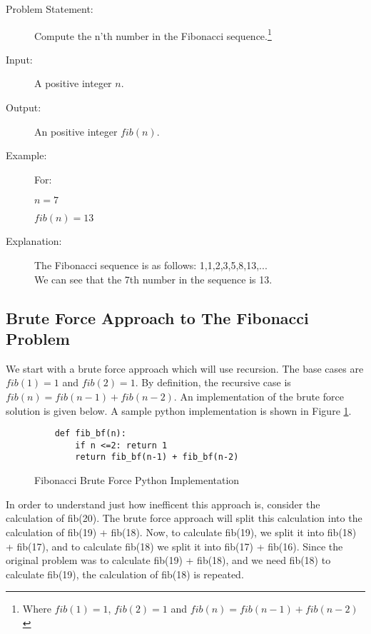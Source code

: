 \begin{description}
    \item[Problem Statement:]
        Compute the n'th number in the Fibonacci sequence.\footnote{Where $fib(1) = 1$, $fib(2) = 1$ and $fib(n) = fib(n-1) + fib(n-2)$}
        
    \item[Input:] 
        A positive integer $n$.
        
    \item[Output:] 
        An positive integer $fib(n)$.
        
    \item[Example:]
        For: 

        $n = 7$
        
        $fib(n) = 13$

    \item[Explanation:]
        The Fibonacci sequence is as follows: 1,1,2,3,5,8,13,...\\
        We can see that the 7th number in the sequence is 13.

\end{description}


\subsection{Brute Force Approach to The Fibonacci Problem}

We start with a brute force approach which will use recursion. 
The base cases are $fib(1) = 1$ and $fib(2) = 1$.
By definition, the recursive case is $fib(n) = fib(n-1) + fib(n-2)$.
An implementation of the brute force solution is given below.
A sample python implementation is shown in Figure \ref{fig:fibonacci-bf}.

\begin{figure}[H]
    \centering
    \begin{lstlisting}
    def fib_bf(n):
        if n <=2: return 1
        return fib_bf(n-1) + fib_bf(n-2)
    \end{lstlisting}
    \caption{Fibonacci Brute Force Python Implementation}
    \label{fig:fibonacci-bf}
\end{figure}

In order to understand just how inefficent this approach is, consider the calculation of fib(20).
The brute force approach will split this calculation into the calculation of fib(19) + fib(18).
Now, to calculate fib(19), we split it into fib(18) + fib(17), and to calculate fib(18) we split it into fib(17) + fib(16).
Since the original problem was to calculate fib(19) + fib(18), and we need fib(18) to calculate fib(19), the calculation of fib(18) is repeated. 


